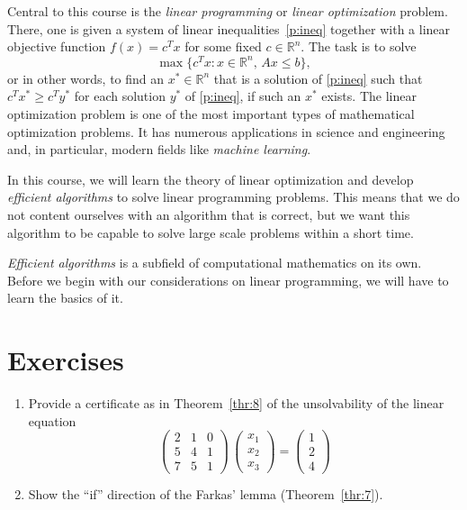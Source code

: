 \documentclass[11pt,envcountchap,pdf]{svmono}
\renewcommand{\leq}{\leqslant}
\begin{document}
Central to this course is the \emph{linear programming} or \emph{linear optimization} problem.  There, one is given a system of linear inequalities~\eqref{p:ineq} together with a linear objective function $f(x) = c^Tx$ for some fixed $c ∈ℝ^n$. The task is to solve 
\begin{equation}
  \label{eq:1}
  \max\{ c^Tx : x ∈ ℝ^n, \, Ax \leq b\}, 
\end{equation}
or in other words, to find an $x^* ∈ ℝ^n$ that is a solution of \eqref{p:ineq} such that $c^T x^* ≥ c^T y^*$ for each solution $y^*$ of \eqref{p:ineq}, if such an $x^*$ exists. 
The linear optimization problem is one of the most important types of mathematical optimization problems. It has numerous applications in science and engineering and, in particular, modern fields like \emph{machine learning}.

In this course, we will learn  the theory of linear optimization and develop \emph{efficient algorithms} to solve linear programming problems. This means that we do not content ourselves with an algorithm that is correct, but we want this algorithm to be capable to solve large scale problems within a short time. 

\emph{Efficient algorithms} is a subfield of computational mathematics on its own. Before we begin with our considerations on linear programming, we will have to learn the basics of it. 






\section*{Exercises}

\begin{enumerate}[1)]
\item Provide a certificate as in Theorem~\ref{thr:8} of the unsolvability of the linear equation 
  \begin{displaymath}
    \begin{pmatrix}
      2 & 1 & 0 \\
      5 & 4 & 1 \\
      7 & 5 & 1
    \end{pmatrix} \,
    \begin{pmatrix}
      x_1 \\ x_2 \\ x_3 
    \end{pmatrix} =
    \begin{pmatrix}
      1\\2\\4
    \end{pmatrix}
  \end{displaymath}
\item Show the ``if'' direction of the Farkas' lemma (Theorem~\ref{thr:7}). 
\end{enumerate}
\end{document}
